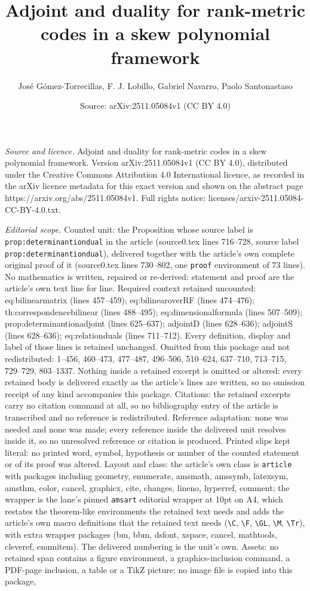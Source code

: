 \documentclass[10pt,a4paper]{amsart}
\title[Adjoint and duality for rank-metric codes in a skew polynomi]{Adjoint and duality for rank-metric codes in a skew polynomial framework}
\author{Jos\'e G\'omez-Torrecillas, F. J. Lobillo, Gabriel Navarro, Paolo Santonastaso}
\date{Source: arXiv:2511.05084v1 (CC BY 4.0)}
\begin{document}
\maketitle

\noindent\emph{Source and licence.} Adjoint and duality for rank-metric codes in a skew polynomial framework. Version arXiv:2511.05084v1 (CC BY 4.0), distributed under the Creative Commons Attribution 4.0 International licence, as recorded in the arXiv licence metadata for this exact version and shown on the abstract page https://arxiv.org/abs/2511.05084v1. Full rights notice: licenses/arxiv-2511.05084-CC-BY-4.0.txt.\par\smallskip

\noindent\textit{Editorial scope.} Counted unit: the Proposition whose source label is \texttt{prop:determinantiondual} in the article (source0.tex lines 716--728, source label \texttt{prop:determinantiondual}), delivered together with the article's own complete original proof of it (source0.tex lines 730--802, one \texttt{proof} environment of 73 lines). No mathematics is written, repaired or re-derived: statement and proof are the article's own text line for line. Required context retained uncounted: eq:bilinearmatrix (lines 457--459); eq:bilinearoverRF (lines 474--476); th:correspondencebilinear (lines 488--495); eq:dimensionalformula (lines 507--509); prop:determinantionadjoint (lines 625--637); adjointD (lines 628--636); adjointS (lines 628--636); eq:relationduals (lines 711--712). Every definition, display and label of those lines is retained unchanged. Omitted from this package and not redistributed: 1--456, 460--473, 477--487, 496--506, 510--624, 637--710, 713--715, 729--729, 803--1337. Nothing inside a retained excerpt is omitted or altered: every retained body is delivered exactly as the article's lines are written, so no omission receipt of any kind accompanies this package. Citations: the retained excerpts carry no citation command at all, so no bibliography entry of the article is transcribed and no reference is redistributed. Reference adaptation: none was needed and none was made; every reference inside the delivered unit resolves inside it, so no unresolved reference or citation is produced. Printed slips kept literal: no printed word, symbol, hypothesis or number of the counted statement or of its proof was altered. Layout and class: the article's own class is \texttt{article} with packages including geometry, enumerate, amsmath, amssymb, latexsym, amsthm, color, cancel, graphicx, cite, changes, lineno, hyperref, comment; the wrapper is the lane's pinned \texttt{amsart} editorial wrapper at 10pt on A4, which restates the theorem-like environments the retained text needs and adds the article's own macro definitions that the retained text needs (\texttt{\textbackslash C}, \texttt{\textbackslash F}, \texttt{\textbackslash GL}, \texttt{\textbackslash M}, \texttt{\textbackslash Tr}), with extra wrapper packages (bm, bbm, dsfont, xspace, cancel, mathtools, cleveref, enumitem). The delivered numbering is the unit's own. Assets: no retained span contains a figure environment, a graphics-inclusion command, a PDF-page inclusion, a table or a TikZ picture; no image file is copied into this package, 
\end{document}
